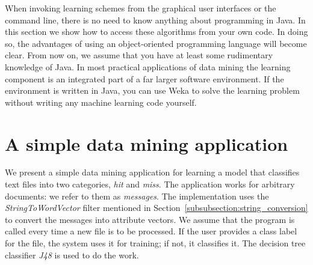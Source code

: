 When invoking learning schemes from the graphical user interfaces or
the command line, there is no need to know anything about programming
in Java. In this section we show how to access these algorithms from
your own code. In doing so, the advantages of using an object-oriented
programming language will become clear. From now on, we assume that
you have at least some rudimentary knowledge of Java. In most
practical applications of data mining the learning component is an
integrated part of a far larger software environment. If the
environment is written in Java, you can use Weka to solve the learning
problem without writing any machine learning code yourself.

\section{A simple data mining application}

We present a simple data mining application for learning a model that
classifies text files into two categories, \textit{hit} and
\textit{miss}. The application works for arbitrary documents: we refer
to them as \textit{messages}. The implementation uses the
\textit{StringToWordVector} filter mentioned in
Section~\ref{subsubsection:string_conversion} to convert the
messages into attribute vectors. We assume that the program is called
every time a new file is to be processed. If the user provides a class
label for the file, the system uses it for training; if not, it
classifies it. The decision tree classifier \textit{J48} is used to do
the work.

